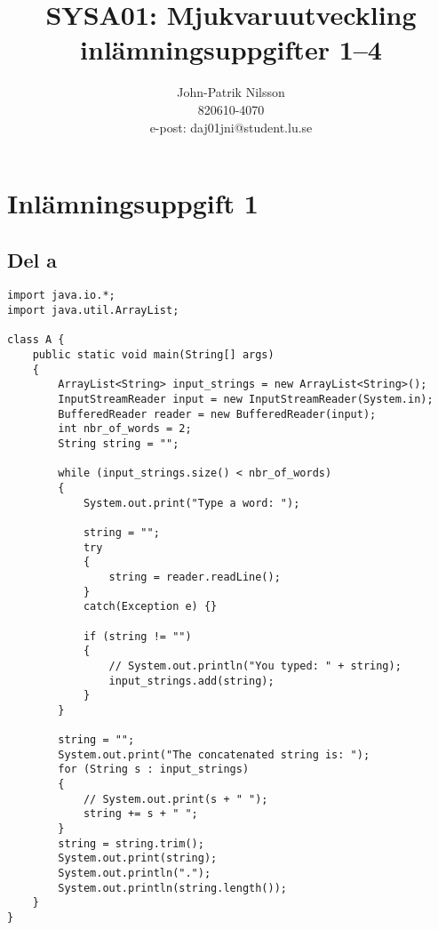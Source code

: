 \documentclass[a4paper,12pt]{article}
\title{\textsf{\textbf{SYSA01: Mjukvaruutveckling \\
    inlämningsuppgifter 1--4}}}
\author{John-Patrik Nilsson \\
    820610-4070 \\
	e-post: daj01jni@student.lu.se}
\begin{document}
\thispagestyle{empty}

\maketitle
\newpage

\tableofcontents

\newpage
\section{\textsf{Inlämningsuppgift 1}}
\subsection{\textsf{Del a}}
\begin{verbatim}
import java.io.*;
import java.util.ArrayList;

class A {
    public static void main(String[] args) 
    {
        ArrayList<String> input_strings = new ArrayList<String>();
        InputStreamReader input = new InputStreamReader(System.in);
        BufferedReader reader = new BufferedReader(input);
        int nbr_of_words = 2;
        String string = "";

        while (input_strings.size() < nbr_of_words)
        {
            System.out.print("Type a word: ");

            string = "";
            try
            {
                string = reader.readLine();
            }
            catch(Exception e) {}
    
            if (string != "")
            {
                // System.out.println("You typed: " + string);
                input_strings.add(string);
            }
        }

        string = "";
        System.out.print("The concatenated string is: ");
        for (String s : input_strings)
        {
            // System.out.print(s + " ");
            string += s + " ";
        }
        string = string.trim();
        System.out.print(string);
        System.out.println(".");
        System.out.println(string.length());
    }
}
\end{verbatim}

\newpage
\end{document}
